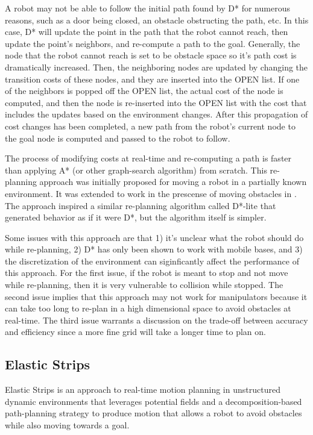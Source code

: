 \documentclass[10pt,conference]{ieeeconf}
\begin{document}
A robot may not be able to follow the initial path found by D* for numerous reasons, such as a door being closed, an obstacle obstructing the path, etc. In this case, D* will update the point in the path that the robot cannot reach, then update the point's neighbors, and re-compute a path to the goal. Generally, the node that the robot cannot reach is set to be obstacle space so it's path cost is dramatically increased. Then, the neighboring nodes are updated by changing the transition costs of these nodes, and they are inserted into the OPEN list. If one of the neighbors is popped off the OPEN list, the actual cost of the node is computed, and then the node is re-inserted into the OPEN list with the cost that includes the updates based on the environment changes. After this propagation of cost changes has been completed, a new path from the robot's current node to the goal node is computed and passed to the robot to follow.

The process of modifying costs at real-time and re-computing a path is faster than applying A* (or other graph-search algorithm) from scratch. This re-planning approach was initially proposed for moving a robot in a partially known environment. It was extended to work in the prescense of moving obstacles in \cite{stentz1995focussed}. The approach inspired a similar re-planning algorithm called D*-lite \cite{koenig2005fast} that generated behavior as if it were D*, but the algorithm itself is simpler. 

Some issues with this approach are that 1) it's unclear what the robot should do while re-planning, 2) D* has only been shown to work with mobile bases, and 3) the discretization of the environment can siginficantly affect the performance of this approach. For the first issue, if the robot is meant to stop and not move while re-planning, then it is very vulnerable to collision while stopped. The second issue implies that this approach may not work for manipulators because it can take too long to re-plan in a high dimensional space to avoid obstacles at real-time. The third issue warrants a discussion on the trade-off between accuracy and efficiency since a more fine grid will take a longer time to plan on. 



\subsection{Elastic Strips} \label{sec:elastic}

Elastic Strips \cite{brock2002elastic} is an approach to real-time motion planning in unstructured dynamic environments that leverages potential fields and a decomposition-based path-planning strategy \cite{brock2001decomposition} to produce motion that allows a robot to avoid obstacles while also moving towards a goal.
\end{document}
